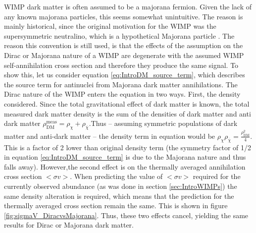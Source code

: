 WIMP dark matter is often assumed to be a majorana fermion. Given the lack of any known majorana particles, this seems somewhat unintuitive. The reason is mainly historical, since the original motivation for the WIMP was the supersymmetric neutralino, which is a hypothetical Majorana particle \cite{Supersymmetry_primer}. The reason this convention is still used, is that the effects of the assumption on the Dirac or Majorana nature of a WIMP are degenerate with the assumed WIMP self-annihilation cross section and therefore they produce the same signal. To show this, let us consider equation \ref{eq:IntroDM_source_term}, which describes the source term for antinuclei from Majorana dark matter annihilations. The Dirac nature of the WIMP enters the equation in two ways. First, the density considered. Since the total gravitational effect of dark matter is known, the total measured dark matter density is the sum of the densities of dark matter and anti dark matter $\rho_{\mathrm{DM}}^{\mathrm{meas}} = \rho_\chi  + \rho_{\overline{\chi}}$.Thus -- assuming symmetric populations of dark matter and anti-dark matter -- the density term in equation would be $\rho_\chi \rho_{\overline{\chi}} = \frac{\rho_{\mathrm{DM}}^2}{4}$. This is a factor of 2 lower than original density term (the symmetry factor of 1/2 in equation \ref{eq:IntroDM_source_term} is due to the Majorana nature and thus falls away). However,the second effect is on the thermally averaged annihilation cross section $<\sigma v>$. When predicting the value of $<\sigma v>$ required for the currently observed abundance (as was done in section \ref{sec:IntroWIMPs}) the same density alteration is required, which means that the prediction for the thermally averaged cross section remain the same. This is shown in figure \ref{fig:sigmaV_DiracvsMajorana}. Thus, these two effects cancel, yielding the same results for Dirac or Majorana dark matter. \\

